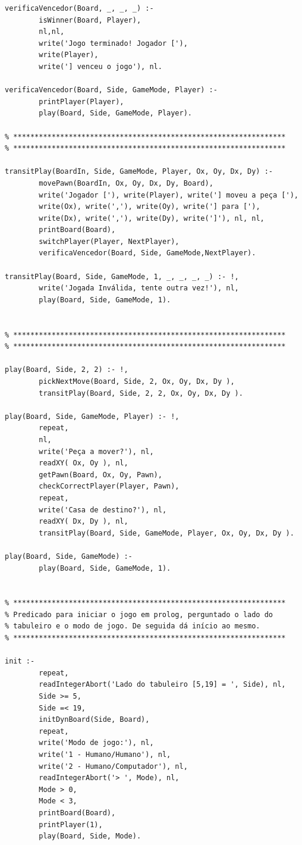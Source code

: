 \documentclass[15pt,a4paper]{article}
\begin{document}
\begin{lstlisting}
verificaVencedor(Board, _, _, _) :-
		isWinner(Board, Player),
		nl,nl,
		write('Jogo terminado! Jogador ['),
		write(Player),
		write('] venceu o jogo'), nl.
	
verificaVencedor(Board, Side, GameMode, Player) :-
		printPlayer(Player),
		play(Board, Side, GameMode, Player).
	
% ****************************************************************
% ****************************************************************

transitPlay(BoardIn, Side, GameMode, Player, Ox, Oy, Dx, Dy) :-
		movePawn(BoardIn, Ox, Oy, Dx, Dy, Board),
		write('Jogador ['), write(Player), write('] moveu a peça ['),
		write(Ox), write(','), write(Oy), write('] para ['),
		write(Dx), write(','), write(Dy), write(']'), nl, nl,
		printBoard(Board),
		switchPlayer(Player, NextPlayer),
		verificaVencedor(Board, Side, GameMode,NextPlayer).

transitPlay(Board, Side, GameMode, 1, _, _, _, _) :- !,
		write('Jogada Inválida, tente outra vez!'), nl,
		play(Board, Side, GameMode, 1).


% ****************************************************************
% ****************************************************************

play(Board, Side, 2, 2) :- !,
		pickNextMove(Board, Side, 2, Ox, Oy, Dx, Dy ),
		transitPlay(Board, Side, 2, 2, Ox, Oy, Dx, Dy ).

play(Board, Side, GameMode, Player) :- !,
		repeat,
		nl,
		write('Peça a mover?'), nl,
		readXY( Ox, Oy ), nl,
		getPawn(Board, Ox, Oy, Pawn),
		checkCorrectPlayer(Player, Pawn),
		repeat,
		write('Casa de destino?'), nl,	
		readXY( Dx, Dy ), nl,
		transitPlay(Board, Side, GameMode, Player, Ox, Oy, Dx, Dy ).
	
play(Board, Side, GameMode) :-
		play(Board, Side, GameMode, 1).


% ****************************************************************
% Predicado para iniciar o jogo em prolog, perguntado o lado do
% tabuleiro e o modo de jogo. De seguida dá início ao mesmo.
% ****************************************************************
	
init :-
		repeat,
		readIntegerAbort('Lado do tabuleiro [5,19] = ', Side), nl,
		Side >= 5,
		Side =< 19,
		initDynBoard(Side, Board),
		repeat,
		write('Modo de jogo:'), nl,
		write('1 - Humano/Humano'), nl,
		write('2 - Humano/Computador'), nl,
		readIntegerAbort('> ', Mode), nl,
		Mode > 0,
		Mode < 3,
		printBoard(Board),
		printPlayer(1),
		play(Board, Side, Mode).

\end{lstlisting}
\end{document}
